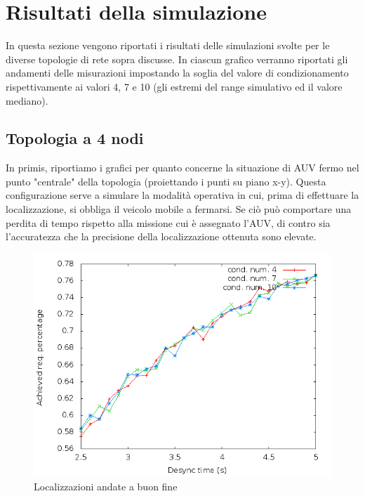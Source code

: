 \documentclass[Lau,binding=0.6cm]{sapthesis}
\begin{document}
\section{Risultati della simulazione}
In questa sezione vengono riportati i risultati delle simulazioni svolte per le diverse topologie di rete sopra discusse. In ciascun grafico verranno riportati gli andamenti delle misurazioni impostando la soglia del valore di condizionamento rispettivamente ai valori 4, 7 e 10 (gli estremi del range simulativo ed il valore mediano).  
\subsection{Topologia a 4 nodi}
In primis, riportiamo i grafici per quanto concerne la situazione di AUV fermo nel punto "centrale" della topologia (proiettando i punti su piano x-y). Questa configurazione serve a simulare la modalità operativa in cui, prima di effettuare la localizzazione, si obbliga il veicolo mobile a fermarsi. Se ciò può comportare una perdita di tempo rispetto alla missione cui è assegnato l'AUV, di contro sia l'accuratezza che la precisione della localizzazione ottenuta sono elevate.

\begin{figure}[H]
    \centering
    \includegraphics[scale=0.5]{squaresimulation/achievedlocpreempt0drop0speed0.png}
    \caption{Localizzazioni andate a buon fine}
    \label{fig:squaresimulation/achievedlocpreempt0drop0speed0}
\end{figure}
\end{document}
